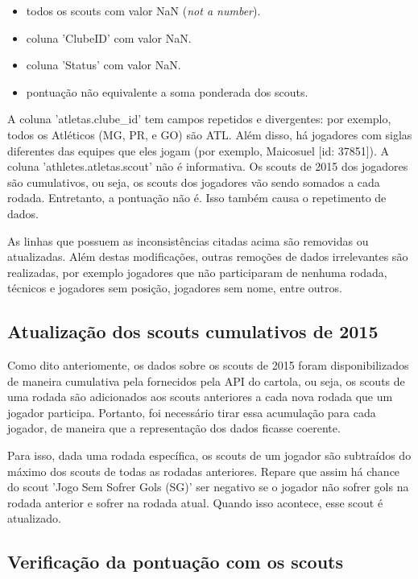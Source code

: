 \documentclass[conference]{IEEEtran}
\newcommand{\tit}[1]{{\textit{#1}}}
\begin{document}
\begin{itemize}
  \item todos os scouts com valor NaN (\tit{not a number}).
  \item coluna 'ClubeID' com valor NaN.
  \item coluna 'Status' com valor NaN.
  \item pontuação não equivalente a soma ponderada dos scouts.
\end{itemize}

A coluna  'atletas.clube\_id' tem campos repetidos  e divergentes: por
exemplo, todos os Atléticos (MG, PR, e GO) são ATL. Além disso, há
jogadores  com  siglas diferentes  das  equipes  que eles  jogam  (por
exemplo,  Maicosuel [id:  37851]).  A coluna  'athletes.atletas.scout'
não é informativa. Os scouts de 2015 dos jogadores são cumulativos,
ou seja,  os scouts dos  jogadores vão  sendo somados a  cada rodada.
Entretanto, a pontuação não é. Isso também causa o repetimento de
dados.

As linhas que possuem as inconsistências citadas acima são removidas
ou  atualizadas. Além  destas  modificações,  outras remoções  de
dados  irrelevantes são  realizadas, por  exemplo jogadores  que não
participaram de  nenhuma rodada, técnicos e  jogadores sem posição,
jogadores sem nome, entre outros.

\subsection{Atualização dos scouts cumulativos de 2015}

Como  dito  anteriomente, os  dados  sobre  os  scouts de  2015  foram
disponibilizados  de maneira  cumulativa pela  fornecidos pela  API do
cartola, ou seja, os scouts de  uma rodada são adicionados aos scouts
anteriores a cada nova rodada  que um jogador participa. Portanto, foi
necessário tirar essa acumulação para  cada jogador, de maneira que
a representação dos dados ficasse coerente.

Para isso, dada  uma rodada específica, os scouts de  um jogador são
subtraídos  do máximo  dos scouts  de todas  as rodadas  anteriores.
Repare que assim  há chance do scout 'Jogo Sem  Sofrer Gols (SG)' ser
negativo se o jogador não sofrer  gols na rodada anterior e sofrer na
rodada atual. Quando isso acontece, esse scout é atualizado.

\subsection{Verificação da pontuação com os scouts}
\end{document}
